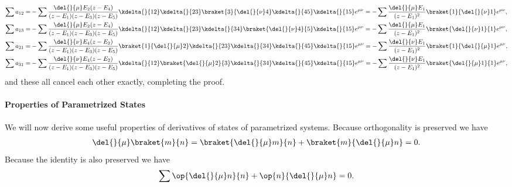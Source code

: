 \begin{align*}
	\sum a_{12} =& -\sum\frac{\del{}{\mu}E_{2}(z - E_{4})}{(z - E_{1})(z - E_{3})(z - E_{5})}\kdelta{}{12}\kdelta{}{23}\braket{3}{\del{}{\nu}4}\kdelta{}{45}\kdelta{}{15}e^{\mu\nu} = -\sum\frac{\del{}{\mu}E_{1}}{(z - E_{1})^{2}}\braket{1}{\del{}{\nu}1}e^{\mu\nu}, \\
	\sum a_{13} =& -\sum\frac{\del{}{\mu}E_{2}(z - E_{4})}{(z - E_{1})(z - E_{3})(z - E_{5})}\kdelta{}{12}\kdelta{}{23}\kdelta{}{34}\braket{\del{}{\nu}4}{5}\kdelta{}{15}e^{\mu\nu} = -\sum\frac{\del{}{\mu}E_{1}}{(z - E_{1})^{2}}\braket{\del{}{\nu}1}{1}e^{\mu\nu}, \\
	\sum a_{21} =& -\sum\frac{\del{}{\nu}E_{4}(z - E_{2})}{(z - E_{1})(z - E_{3})(z - E_{5})}\braket{1}{\del{}{\mu}2}\kdelta{}{23}\kdelta{}{34}\kdelta{}{45}\kdelta{}{15}e^{\mu\nu} = -\sum\frac{\del{}{\nu}E_{1}}{(z - E_{1})^{2}}\braket{1}{\del{}{\mu}1}e^{\mu\nu}, \\
	\sum a_{31} =& -\sum\frac{\del{}{\nu}E_{4}(z - E_{2})}{(z - E_{1})(z - E_{3})(z - E_{5})}\kdelta{}{12}\braket{\del{}{\mu}2}{3}\kdelta{}{34}\kdelta{}{45}\kdelta{}{15}e^{\mu\nu} = -\sum\frac{\del{}{\nu}E_{1}}{(z - E_{1})^{2}}\braket{\del{}{\mu}1}{1}e^{\mu\nu},
\end{align*}
and these all cancel each other exactly, completing the proof.

\paragraph{Properties of Parametrized States}
We will now derive some useful properties of derivatives of states of parametrized systems. Because orthogonality is preserved we have
\begin{align*}
	\del{}{\mu}\braket{m}{n} = \braket{\del{}{\mu}m}{n} + \braket{m}{\del{}{\mu}n} = 0.
\end{align*}
Because the identity is also preserved we have
\begin{align*}
	\sum\op{\del{}{\mu}n}{n} + \op{n}{\del{}{\mu}n} = 0.
\end{align*}

